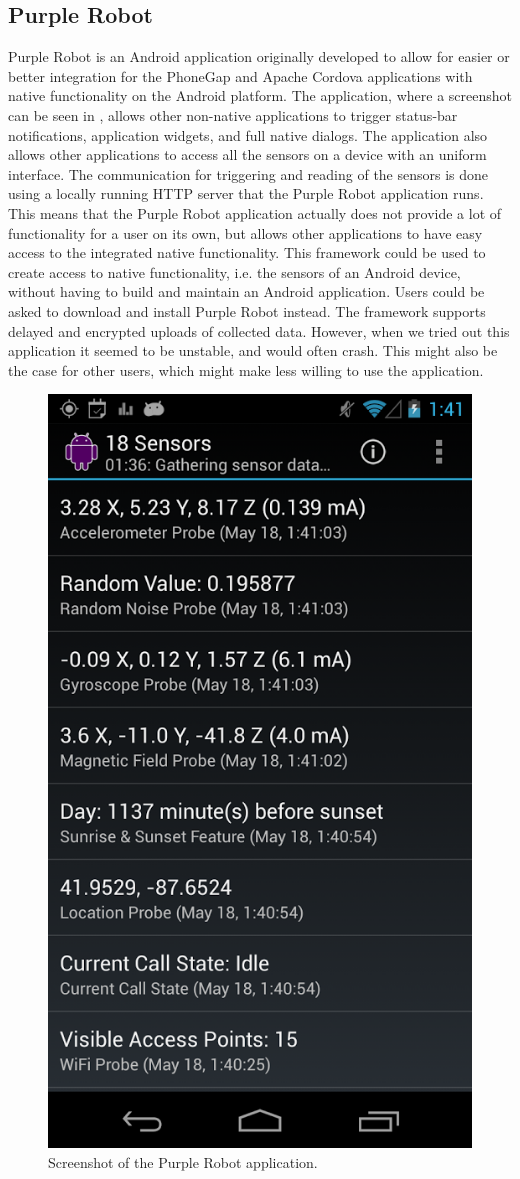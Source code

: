 \subsection{Purple Robot}
\label{sub:purple_robot} 
Purple Robot \parencite{purple_robot} is an Android application originally developed to allow for easier or better integration for the PhoneGap and Apache Cordova applications with native functionality on the Android platform. The application, where a screenshot can be seen in , allows other non-native applications to trigger status-bar notifications, application widgets, and full native dialogs. The application also allows other applications to access all the sensors on a device with an uniform interface. The communication for triggering and reading of the sensors is done using a locally running HTTP server that the Purple Robot application runs. This means that the Purple Robot application actually does not provide a lot of functionality for a user on its own, but allows other applications to have easy access to the integrated native functionality. This framework could be used to create access to native functionality, i.e. the sensors of an Android device, without having to build and maintain an Android application. Users could be asked to download and install Purple Robot instead. The framework supports delayed and encrypted uploads of collected data. However, when we tried out this application it seemed to be unstable, and would often crash. This might also be the case for other users, which might make less willing to use the application.

\begin{figure}[!htbp]
	\centering
	\includegraphics[height=0.5\textwidth]{graphic/existing_solutions/purple_robot.png}
	\caption[]{Screenshot of the Purple Robot application\parencite{purple_robot_google_play_store}.}
	\label{fig:purple_robot_screenshot}
\end{figure}
\FloatBarrier

